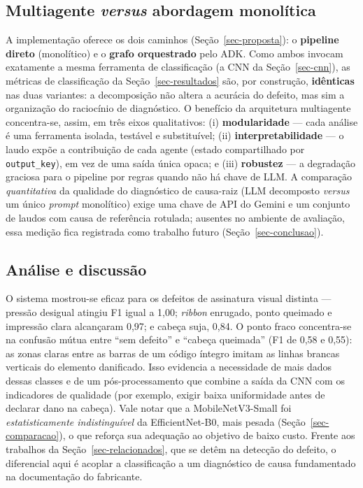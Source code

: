 \documentclass[
	article,			%
	11pt,				%
	oneside,			%
	a4paper,			%
	english,			%
	brazilian,			%
	sumario=tradicional
	]{abntex2}
\begin{document}
\subsection{Multiagente \textit{versus} abordagem monolítica}\label{sec-baseline}

A implementação oferece os dois caminhos (Seção~\ref{sec-proposta}): o
\textbf{pipeline direto} (monolítico) e o \textbf{grafo orquestrado} pelo ADK. Como
ambos invocam exatamente a mesma ferramenta de classificação (a CNN da
Seção~\ref{sec-cnn}), as métricas de classificação da Seção~\ref{sec-resultados}
são, por construção, \textbf{idênticas} nas duas variantes: a decomposição não
altera a acurácia do defeito, mas sim a organização do raciocínio de diagnóstico. O
benefício da arquitetura multiagente concentra-se, assim, em três eixos
qualitativos: (i) \textbf{modularidade} --- cada análise é uma ferramenta isolada,
testável e substituível; (ii) \textbf{interpretabilidade} --- o laudo expõe a
contribuição de cada agente (estado compartilhado por \texttt{output\_key}), em vez
de uma saída única opaca; e (iii) \textbf{robustez} --- a degradação graciosa para o
pipeline por regras quando não há chave de LLM. A comparação \emph{quantitativa} da
qualidade do diagnóstico de causa-raiz (LLM decomposto \textit{versus} um único
\textit{prompt} monolítico) exige uma chave de API do Gemini e um conjunto de laudos
com causa de referência rotulada; ausentes no ambiente de avaliação, essa medição
fica registrada como trabalho futuro (Seção~\ref{sec-conclusao}).

\subsection{Análise e discussão}

O sistema mostrou-se eficaz para os defeitos de assinatura visual distinta ---
pressão desigual atingiu F1 igual a 1,00; \textit{ribbon} enrugado, ponto queimado e
impressão clara alcançaram 0,97; e cabeça suja, 0,84. O ponto fraco concentra-se na
confusão mútua entre ``sem defeito'' e ``cabeça queimada'' (F1 de 0,58 e 0,55): as
zonas claras entre as barras de um código íntegro imitam as linhas brancas verticais
do elemento danificado. Isso evidencia a necessidade de mais dados dessas classes e de
um pós-processamento que combine a saída da CNN com os indicadores de qualidade (por
exemplo, exigir baixa uniformidade antes de declarar dano na cabeça). Vale notar que a
MobileNetV3-Small foi \emph{estatisticamente indistinguível} da EfficientNet-B0, mais
pesada (Seção~\ref{sec-comparacao}), o que reforça sua adequação ao objetivo de baixo
custo. Frente aos trabalhos da Seção~\ref{sec-relacionados}, que se detêm na detecção
do defeito, o diferencial aqui é acoplar a classificação a um diagnóstico de causa
fundamentado na documentação do fabricante.
\end{document}
